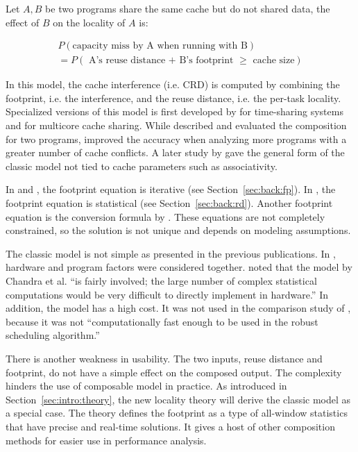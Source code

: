 Let $A,B$ be two programs share the same cache but do not shared data,
the effect of $B$ on the locality of $A$ is:

\begin{eqnarray*}
P(\mbox{capacity miss by A when running with B}) \\
= P(\mbox{ A's reuse distance + B's footprint $\ge$ cache size})
\end{eqnarray*}

In this model, the cache interference (i.e. CRD) is computed by
combining the footprint, i.e. the interference, and the reuse
distance, i.e. the per-task locality.  Specialized versions of
this model is first developed by \citet{Suh+:ICS01} for time-sharing
systems and \citet{Chandra+:HPCA05} for multicore cache sharing.  
While \citet{Chandra+:HPCA05} described and evaluated the composition
for two programs, \citet{ChenA:HPCA09} improved the accuracy when
analyzing more programs with a greater number of cache conflicts.
A later study by \citet{Jiang+:HiPEAC10} gave the general form of
the classic model not tied to cache parameters such as associativity.  

In \citet{Suh+:ICS01} and \citet{Chandra+:HPCA05}, the footprint
equation is iterative
(see Section~\ref{sec:back:fp}).  In \citet{Jiang+:HiPEAC10}, 
the footprint equation is statistical (see Section~\ref{sec:back:rd}).
Another footprint equation is the
conversion formula by \citet{DenningS:CACM72}.
These equations are not completely constrained, so the solution
is not unique and depends on modeling assumptions.  

The classic model is not simple as presented in the previous
publications.  In \citet{Chandra+:HPCA05}, hardware and program
factors were considered together.  \citet{XieL:MSI08} noted that the
model by Chandra et al. ``is fairly involved; the large number of
complex statistical computations would be very difficult to directly
implement in hardware.''  In addition, the model has a high cost.  It
was not used in the comparison study of \citet{Zhuravlev+:ASPLOS10},
because it was not ``computationally fast enough to be used in the
robust scheduling algorithm.''  

There is another weakness in usability.  The two inputs, reuse distance and
footprint, do not have a simple effect on the composed output.  The
complexity hinders the use of composable model in practice.  As introduced in
Section~\ref{sec:intro:theory}, the new locality theory will derive
the classic model as a special case.  The theory defines the footprint
as a type of all-window statistics that have precise and real-time
solutions.  It gives a host of other composition methods for easier use
in performance analysis.


